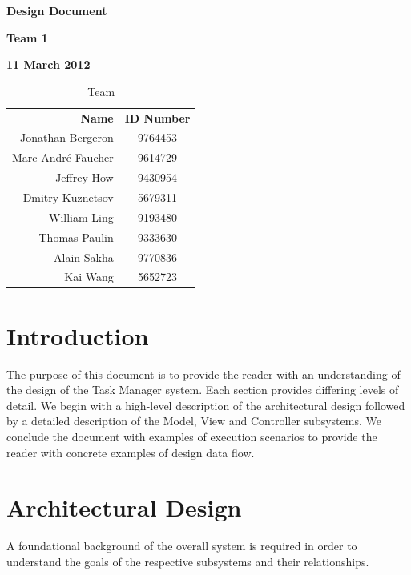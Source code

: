 \documentclass[12pt]{article}
\newcommand{\systemName}{Task Manager }
\begin{document}
\vspace*{0.5in}
\centerline{\bf\Large Design Document}

\vspace*{0.5in}
\centerline{\bf\Large Team 1}

\vspace*{0.5in}
\centerline{\bf\Large 11 March 2012}

\vspace*{1.5in}
\begin{table}[htbp]
\caption{Team}
\begin{center}
\begin{tabular}{|r | c|}
\hline
{\bf Name} & {\bf ID Number} \\
Jonathan Bergeron & 9764453 \\
Marc-Andr\'{e} Faucher & 9614729 \\
Jeffrey How & 9430954 \\
Dmitry Kuznetsov & 5679311 \\
William Ling & 9193480 \\
Thomas Paulin & 9333630 \\
Alain Sakha & 9770836 \\
Kai Wang & 5652723 \\
\hline
\end{tabular}
\end{center}
\end{table}

\clearpage

\section{Introduction}

The purpose of this document is to provide the reader with an understanding of the design of the \systemName system. Each section provides differing levels of detail. We begin with a high-level description of the architectural design followed by a detailed description of the Model, View and Controller subsystems. We conclude the document with examples of execution scenarios to provide the reader with concrete examples of design data flow.

\section{Architectural Design} \label{sec:arch}

A foundational background of the overall system is required in order to understand the goals of the respective subsystems and their relationships.
\end{document}
